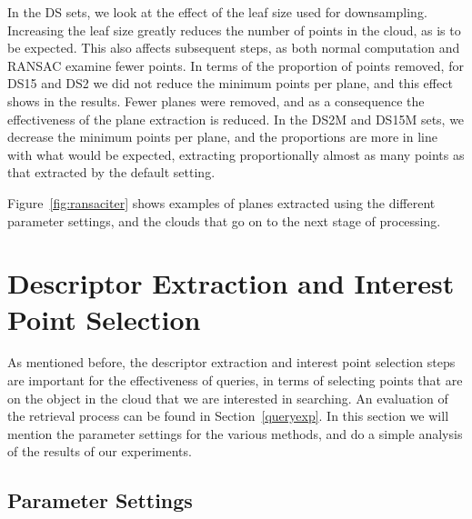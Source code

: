 \documentclass[11pt,a4paper]{kth-mag}
\begin{document}
In the DS sets, we look at the effect of the leaf size used for downsampling.
Increasing the leaf size greatly reduces the number of points in the cloud, as
is to be expected. This also affects subsequent steps, as both normal
computation and RANSAC examine fewer points. In terms of the proportion of
points removed, for DS15 and DS2 we did not reduce the minimum points per plane,
and this effect shows in the results. Fewer planes were removed, and as a
consequence the effectiveness of the plane extraction is reduced. In the DS2M
and DS15M sets, we decrease the minimum points per plane, and the proportions
are more in line with what would be expected, extracting proportionally almost
as many points as that extracted by the default setting.

Figure~\ref{fig:ransaciter} shows examples of planes extracted using the
different parameter settings, and the clouds that go on to the next stage of processing.

\section{Descriptor Extraction and Interest Point Selection}
As mentioned before, the descriptor extraction and interest point selection steps
are important for the effectiveness of queries, in terms of selecting points
that are on the object in the cloud that we are interested in searching.
An evaluation of the retrieval process can be found in Section~\ref{queryexp}.
In this section we will mention the parameter settings for the various methods,
and do a simple analysis of the results of our experiments.

\subsection{Parameter Settings}
\end{document}
